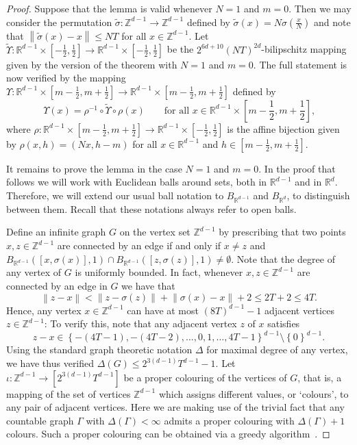 \documentclass[a4paper, bibliography=totoc]{scrartcl}
\numberwithin{claimcounter}{define}
\newcommand{\R}{\mathbb{R}}
\newcommand{\Z}{\mathbb{Z}}
\newcommand{\enorm}[1]{\left\|#1\right\|}
\newcommand{\set}[1]{\left\{#1\right\}}
\newcommand{\br}[1]{\left(#1\right)}
\newcommand{\sqbr}[1]{\left[#1\right]}
\newcommand{\wt}[1]{\widetilde{#1}}
\begin{document}
\begin{proof}
	Suppose that the lemma is valid whenever $N=1$ and $m=0$. Then we may consider the permutation $\wt{\sigma}\colon \Z^{d-1}\to\Z^{d-1}$ defined by $\wt{\sigma}(x)=N\sigma\br{\frac{x}{N}}$ and note that $\enorm{\wt{\sigma}(x)-x}\leq NT$ for all $x\in \Z^{d-1}$. Let $\wt{\Upsilon}\colon \R^{d-1}\times\sqbr{-\frac{1}{2},\frac{1}{2}}\to \R^{d-1}\times\sqbr{-\frac{1}{2},\frac{1}{2}}$ be the $2^{6d+10}\br{NT}^{2d}$-bilipschitz mapping given by the version of the theorem with $N=1$ and $m=0$. The full statement is now verified by the mapping $\Upsilon\colon \R^{d-1}\times\sqbr{m-\frac{1}{2},m+\frac{1}{2}}\to\R^{d-1}\times\sqbr{m-\frac{1}{2},m+\frac{1}{2}}$ defined by 
	\begin{equation*}
	\Upsilon(x)=\rho^{-1}\circ\wt{\Upsilon}\circ \rho(x)\qquad\text{for all $x\in \R^{d-1}\times\sqbr{m-\frac{1}{2},m+\frac{1}{2}}$,}
	\end{equation*}
	where $\rho\colon \R^{d-1}\times \sqbr{m-\frac{1}{2},m+\frac{1}{2}}\to\R^{d-1}\times\sqbr{-\frac{1}{2},\frac{1}{2}}$ is the affine bijection given by $\rho(x,h)=(Nx,h-m)$ for all $x\in\R^{d-1}$ and $h\in\sqbr{m-\frac{1}{2},m+\frac{1}{2}}$.
	
	It remains to prove the lemma in the case $N=1$ and $m=0$. In the proof that follows we will work with Euclidean balls around sets, both in $\R^{d-1}$ and in $\R^{d}$. Therefore, we will extend our usual ball notation to $B_{\R^{d-1}}$ and $B_{\R^{d}}$, to distinguish between them. Recall that these notations always refer to open balls.
	
	Define an infinite graph $G$ on the vertex set $\Z^{d-1}$ by prescribing that two points $x,z\in\Z^{d-1}$ are connected by an edge if and only if $x\neq z$ and $B_{\R^{d-1}}([x,\sigma(x)],1)\cap B_{\R^{d-1}}([z,\sigma(z)],1)\neq \emptyset$. Note that the degree of any vertex of $G$ is uniformly bounded. In fact, whenever $x,z\in\Z^{d-1}$ are connected by an edge in $G$ we have that
	\begin{equation*}
	\enorm{z-x}< \enorm{z-\sigma(z)}+\enorm{\sigma(x)-x}+2\leq 2T+2\leq 4T.
	\end{equation*}
	Hence, any vertex $x\in\Z^{d-1}$ can have at most $(8T)^{d-1}-1$ adjacent vertices $z\in\Z^{d-1}$: To verify this, note that any adjacent vertex $z$ of $x$ satisfies 
	\begin{equation*}
		z-x\in\set{-(4T-1),-(4T-2),\ldots,0,1,\ldots,4T-1}^{d-1}\setminus \set{0}^{d-1}.
	\end{equation*}
	Using the standard graph theoretic notation $\Delta$ for maximal degree of any vertex, we have thus verified $\Delta(G)\leq 2^{3(d-1)}T^{d-1}-1$. Let $\iota\colon \Z^{d-1}\to\sqbr{2^{3(d-1)}T^{d-1}}$ be a proper colouring of the vertices of $G$, that is, a mapping of the set of vertices $\Z^{d-1}$ which assigns different values, or `colours', to any pair of adjacent vertices. Here we are making use of the trivial fact that any countable graph $\Gamma$ with $\Delta(\Gamma)<\infty$ admits a proper colouring with $\Delta(\Gamma)+1$ colours. Such a proper colouring can be obtained via a greedy algorithm~\cite[Proposition 5.2.2]{DiestelGT}.
	

\end{proof}
\end{document}
